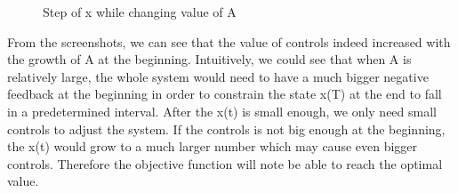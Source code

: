 \documentclass{mcmthesis}
\begin{document}
\begin{figure}[H]
%
%
%


\centering
\caption{Step of x while changing value of A}
\end{figure}


From the screenshots, we can see that the value of controls indeed increased with the growth of A at the beginning. Intuitively, we could see that when A is relatively large, the whole system would need to have a much bigger negative feedback at the beginning in order to constrain the state x(T) at the end to fall in a predetermined interval. After the x(t) is small enough, we only need small controls to adjust the system. If the controls is not big enough at the beginning, the x(t) would grow to a much larger number which may cause even bigger controls. Therefore the objective function will note be able to reach the optimal value.
\end{document}
